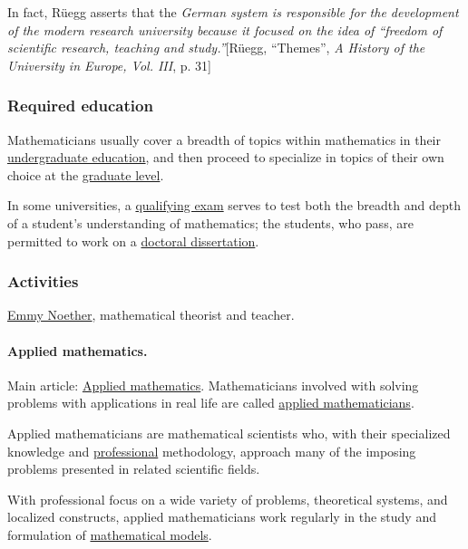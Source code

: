 \documentclass{article}
\begin{document}
In fact, Rüegg asserts that the \textit{German system is responsible for the development of the modern research university because it focused on the idea of ``freedom of scientific research, teaching and study.''}[Rüegg, ``Themes'', \textit{A History of the University in Europe, Vol. III}, p. 31]

\subsubsection{Required education}
Mathematicians usually cover a breadth of topics within mathematics in their \href{https://en.wikipedia.org/wiki/Undergraduate_education}{undergraduate education}, and then proceed to specialize in topics of their own choice at the \href{https://en.wikipedia.org/wiki/Graduate-level}{graduate level}.

In some universities, a \href{https://en.wikipedia.org/wiki/Qualifying_exam}{qualifying exam} serves to test both the breadth and depth of a student's understanding of mathematics; the students, who pass, are permitted to work on a \href{https://en.wikipedia.org/wiki/Doctoral_dissertation}{doctoral dissertation}.

\subsubsection{Activities}
\textsf{\href{https://en.wikipedia.org/wiki/Emmy_Noether}{Emmy Noether}, mathematical theorist and teacher.}

\paragraph{Applied mathematics.} Main article: \href{https://en.wikipedia.org/wiki/Applied_mathematics}{Applied mathematics}. Mathematicians involved with solving problems with applications in real life are called \href{https://en.wikipedia.org/wiki/Applied_mathematician}{applied mathematicians}.

Applied mathematicians are mathematical scientists who, with their specialized knowledge and \href{https://en.wikipedia.org/wiki/Professional}{professional} methodology, approach many of the imposing problems presented in related scientific fields.

With professional focus on a wide variety of problems, theoretical systems, and localized constructs, applied mathematicians work regularly in the study and formulation of \href{https://en.wikipedia.org/wiki/Mathematical_models}{mathematical models}.
\end{document}

